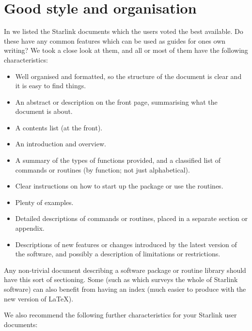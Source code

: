 \section{\label{GoodStyle}Good style and organisation}

In  we listed the Starlink documents which
the users voted the best available.
Do these have any common features which can be used as guides for ones own
writing?
We took a close look at them, and all or most of them have the following
characteristics:

\begin{itemize}
\item Well organised and formatted, so the structure of the document
is clear and it is easy to find things.
\item An abstract or description on the front page, summarising what the
document is about.
\item A contents list (at the front).
\item An introduction and overview.
\item A summary of the types of functions provided, and a classified list of
commands or routines (by function; not just alphabetical).
\item Clear instructions on how to start up the package or use the routines.
\item Plenty of examples.
\item Detailed descriptions of commands or routines, placed in a separate
section or appendix.
\item Descriptions of new features or changes introduced by the latest version
of the software, and possibly a description of limitations or restrictions.
\end{itemize}

Any non-trivial document describing a software package or routine library
should have this sort of sectioning.
Some (such as  which surveys the whole of Starlink
software) can also benefit from having an index (much easier to produce with
the new version of \LaTeX).

We also recommend the following further characteristics for your Starlink user
documents:

